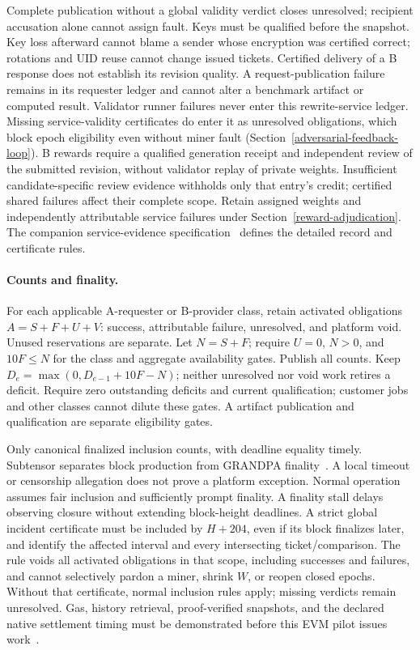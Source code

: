 Complete publication without a global validity verdict closes unresolved;
recipient accusation alone cannot assign fault. Keys must be qualified
before the snapshot. Key loss afterward cannot blame a sender whose
encryption was certified correct; rotations and UID reuse cannot change
issued tickets. Certified delivery of a B response does not establish
its revision quality. A request-publication failure remains in its
requester ledger and cannot alter a benchmark artifact or computed result.
Validator runner failures never enter this rewrite-service ledger.
Missing service-validity certificates do enter it as unresolved
obligations, which block epoch eligibility even without miner fault
(Section~\ref{adversarial-feedback-loop}).
B rewards require a qualified generation receipt and independent review
of the submitted revision, without validator replay of private weights.
Insufficient candidate-specific review evidence withholds only that
entry's credit; certified shared failures affect their complete scope.
Retain assigned weights and independently attributable service failures
under Section~\ref{reward-adjudication}. The companion service-evidence
specification~\cite{serviceevidence} defines the detailed record and
certificate rules.

\paragraph{Counts and finality.}
For each applicable A-requester or B-provider class, retain activated obligations
\(A=S+F+U+V\): success, attributable failure, unresolved, and platform void.
Unused reservations are separate. Let \(N=S+F\); require \(U=0\), \(N>0\),
and \(10F\leq N\) for the class and aggregate availability gates. Publish
all counts. Keep \(D_e=\max(0,D_{e-1}+10F-N)\); neither unresolved nor void
work retires a deficit. Require zero outstanding deficits and current
qualification; customer jobs and other classes cannot dilute these gates.
A artifact publication and qualification are separate eligibility gates.

Only canonical finalized inclusion counts, with deadline equality timely.
Subtensor separates block production from GRANDPA
finality~\cite{btchainconsensus}. A local timeout or censorship allegation
does not prove a platform exception. Normal operation assumes fair
inclusion and sufficiently prompt finality. A finality stall delays
observing closure without extending block-height deadlines. A strict
global incident certificate must be included by \(H+204\), even if its
block finalizes later, and identify the affected interval and every
intersecting ticket/comparison. The rule
voids all activated obligations in that scope, including successes and
failures, and cannot selectively pardon a miner, shrink \(W\), or reopen
closed epochs. Without that certificate, normal inclusion rules apply;
missing verdicts remain unresolved. Gas, history retrieval, proof-verified
snapshots, and the declared native settlement timing must be demonstrated
before this EVM pilot issues work~\cite{evm}.
